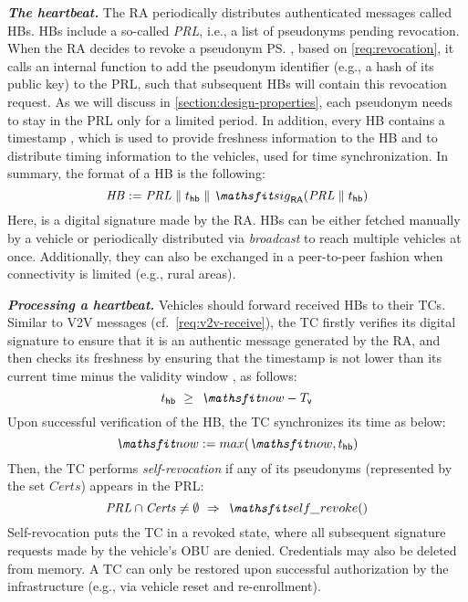\noindent\textbf{\emph{The heartbeat.}}
%
The \ac{RA} periodically distributes authenticated messages called \acfp{HB}.
\acp{HB} include a so-called \emph{\ac{PRL}}, i.e., a list of pseudonyms pending
revocation. When the \ac{RA} decides to revoke a pseudonym \ps, based on
\cref{req:revocation}, it calls an internal \funcrevokedaa{} function to add the
pseudonym identifier (e.g., a hash of its public key) to the \ac{PRL}, such that
subsequent \acp{HB} will contain this revocation request. As we will discuss in
\cref{section:design-properties}, each pseudonym needs to stay in the \ac{PRL}
only for a limited period. In addition, every \ac{HB} contains a timestamp
\paramthb, which is used to provide freshness information to the \ac{HB} and to
distribute timing information to the vehicles, used for time synchronization. In
summary, the format of a \ac{HB} is the following:
%
\begin{equation}
    \label{eq:heartbeat-format}
    \mathit{HB} := \mathit{PRL} \parallel \paramthb{} \parallel \funcsignature{\mathit{PRL} \parallel \paramthb}
\end{equation} 
%
Here, \funcsignature{} is a digital signature made by the \ac{RA}. \acp{HB} can
be either fetched manually by a vehicle or periodically distributed via
\emph{broadcast} to reach multiple vehicles at once. Additionally, they can also
be exchanged in a peer-to-peer fashion when connectivity is limited (e.g., rural
areas).

\noindent\textbf{\emph{Processing a heartbeat.}}
\label{section:design-processing-hb}
%
Vehicles should forward received \acp{HB} to their \acp{TC}. Similar to \ac{V2V}
messages (cf.~\cref{req:v2v-receive}), the \ac{TC} firstly verifies its digital
signature to ensure that it is an authentic message generated by the \ac{RA},
and then checks its freshness by ensuring that the timestamp \paramthb{} is not
lower than its current time \funcnow{} minus the validity window \paramtt, as
follows:
%
\begin{equation}
    \label{eq:valid-heartbeat}
    \paramthb{} \ \geq\  \funcnow - \paramtt
\end{equation}
%
Upon successful verification of the \ac{HB}, the \ac{TC} synchronizes its time
as below:
%
\begin{equation}
    \label{eq:time-update}
    \funcnow{} := max(\funcnow{}, \paramthb{})
\end{equation}
%
Then, the \ac{TC} performs \emph{self-revocation} if any of its pseudonyms
(represented by the set $\mathit{Certs}$) appears in the \ac{PRL}:
%
\begin{equation}
    \label{eq:self-rev}
    \mathit{PRL} \cap \mathit{Certs} \neq \emptyset \ \Rightarrow\  \funcselfrevoke{}
\end{equation}
%
Self-revocation puts the \ac{TC} in a revoked state, where all subsequent
signature requests made by the vehicle's \ac{OBU} are denied. Credentials may
also be deleted from memory. A \ac{TC} can only be restored upon successful
authorization by the infrastructure (e.g., via vehicle reset and re-enrollment).


